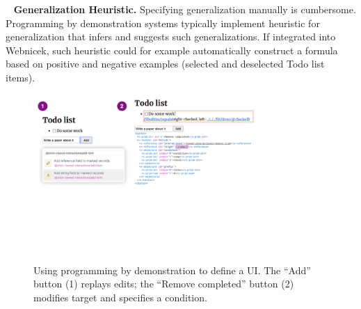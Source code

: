 \documentclass[sigconf,anonymous,screen]{acmart}
\newcommand{\note}[1]{\textcolor{red}{#1}}
\DeclareRobustCommand{\keyideabox}[3]{\begin{tcolorbox}[breakable,
  boxsep=5pt,left=0pt,right=0pt,top=0pt,bottom=0pt,width=\dimexpr\columnwidth\relax,
  colback=gray!20,colframe=gray!20,
  enlarge bottom by=0pt,enlarge top by=0pt,
  arc=0pt,outer arc=0pt]
\lettrine[lraise=0.3]{\LARGE #1}{~}
\small \textbf{#2.} #3
\end{tcolorbox}
}
\begin{document}
%

\keyideabox{\faMagic}{Generalization Heuristic}{Specifying generalization manually is cumbersome.
Programming by demonstration systems typically implement heuristic for generalization
\cite{myers-2000-intelligence} that infers and suggests such generalizations. If integrated into
Webnicek, such heuristic could for example automatically construct a formula
based on positive and negative examples \cite{gulwani-2014-flash} (selected and deselected Todo
list items).}


\begin{figure}[t]
\vspace{-0.5em}
\includegraphics[width=1\columnwidth,clip,trim=0.5cm 8.5cm 8.5cm 0.5cm]{fig/interactive.pdf}
\vspace{-1.25em}
\caption{Using programming by demonstration to define a UI. The ``Add'' button (1) replays edits;
the ``Remove completed'' button (2) modifies target and specifies a condition. }
\label{fig:interactive}
\vspace{-1em}
\end{figure}
\end{document}
